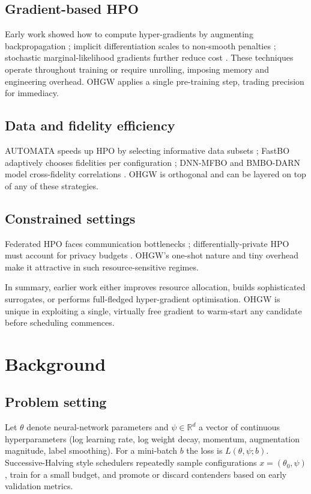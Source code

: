 \documentclass{article}
\begin{document}
\subsection{Gradient-based HPO}
Early work showed how to compute hyper-gradients by augmenting backpropagation \cite{chandra-2019-gradient}; implicit differentiation scales to non-smooth penalties \cite{bertrand-2020-implicit}; stochastic marginal-likelihood gradients further reduce cost \cite{immer-2023-stochastic}. These techniques operate throughout training or require unrolling, imposing memory and engineering overhead. OHGW applies a single pre-training step, trading precision for immediacy.

\subsection{Data and fidelity efficiency}
AUTOMATA speeds up HPO by selecting informative data subsets \cite{killamsetty-2022-automata}; FastBO adaptively chooses fidelities per configuration \cite{jiang-2024-efficient}; DNN-MFBO and BMBO-DARN model cross-fidelity correlations \cite{li-2020-multi,li-2021-batch}. OHGW is orthogonal and can be layered on top of any of these strategies.

\subsection{Constrained settings}
Federated HPO faces communication bottlenecks \cite{khodak-2021-federated}; differentially-private HPO must account for privacy budgets \cite{panda-2022-new,wang-2023-hypo}. OHGW's one-shot nature and tiny overhead make it attractive in such resource-sensitive regimes.

In summary, earlier work either improves resource allocation, builds sophisticated surrogates, or performs full-fledged hyper-gradient optimisation. OHGW is unique in exploiting a single, virtually free gradient to warm-start any candidate before scheduling commences.

\section{Background}
\subsection{Problem setting}
Let \(\theta\) denote neural-network parameters and \(\psi \in \mathbb{R}^d\) a vector of continuous hyperparameters (log learning rate, log weight decay, momentum, augmentation magnitude, label smoothing). For a mini-batch \(b\) the loss is \(L(\theta,\psi; b)\). Successive-Halving style schedulers repeatedly sample configurations \(x=(\theta_0,\psi)\), train for a small budget, and promote or discard contenders based on early validation metrics.
\end{document}
